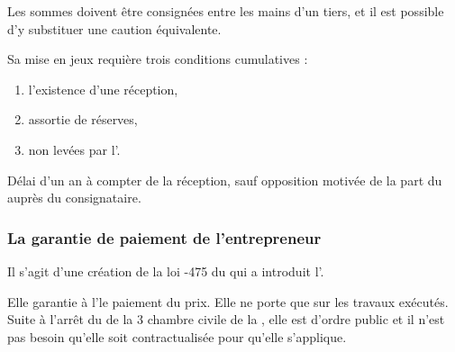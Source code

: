 				Les sommes doivent être consignées entre les mains d'un tiers, et il est possible d'y substituer une caution équivalente.
				
				Sa mise en jeux requière trois conditions cumulatives :
				\begin{enumerate}
					\item l'existence d'une réception,
					\item assortie de réserves,
					\item non levées par l'\E.
				\end{enumerate}
				
				Délai d'un an à compter de la réception, sauf opposition motivée de la part du \Mo auprès du consignataire.
			
			\subsubsection{La garantie de paiement de l'entrepreneur}
			
				Il s'agit d'une création de la loi -475 du  qui a introduit l'.
				
				Elle garantie à l'\E le paiement du prix. Elle ne porte que sur les travaux exécutés. Suite à l'arrêt du  de la 3\ieme{} chambre civile de la \CourDeCas, elle est d'ordre public et il n'est pas besoin qu'elle soit contractualisée pour qu'elle s'applique.
				
